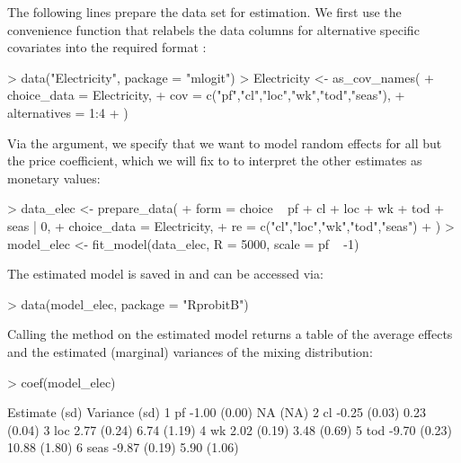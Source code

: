\documentclass[article]{jss}
\newcommand{\fct}[1]{\code{#1()}}
\begin{document}
The following lines prepare the  data set for estimation. We first use the convenience function \fct{as\_cov\_names} that relabels the data columns for alternative specific covariates into the required format :

\begin{Schunk}
\begin{Sinput}
> data("Electricity", package = "mlogit")
> Electricity <- as_cov_names(
+    choice_data = Electricity,
+    cov = c("pf","cl","loc","wk","tod","seas"),
+    alternatives = 1:4
+  )
\end{Sinput}
\end{Schunk}

Via the  argument, we specify that we want to model random effects for all but the price coefficient, which we will fix to  to interpret the other estimates as monetary values:

\begin{Schunk}
\begin{Sinput}
> data_elec <- prepare_data(
+    form = choice ~ pf + cl + loc + wk + tod + seas | 0,
+    choice_data = Electricity,
+    re = c("cl","loc","wk","tod","seas")
+  )
> model_elec <- fit_model(data_elec, R = 5000, scale = pf ~ -1)
\end{Sinput}
\end{Schunk}

The estimated model is saved in  and can be accessed via:

\begin{Schunk}
\begin{Sinput}
> data(model_elec, package = "RprobitB")
\end{Sinput}
\end{Schunk}

Calling the \fct{coef} method on the estimated model returns a table of the average effects and the estimated (marginal) variances of the mixing distribution:

\begin{Schunk}
\begin{Sinput}
> coef(model_elec)
\end{Sinput}
\begin{Soutput}
        Estimate   (sd) Variance   (sd)
1   pf     -1.00 (0.00)       NA   (NA)
2   cl     -0.25 (0.03)     0.23 (0.04)
3  loc      2.77 (0.24)     6.74 (1.19)
4   wk      2.02 (0.19)     3.48 (0.69)
5  tod     -9.70 (0.23)    10.88 (1.80)
6 seas     -9.87 (0.19)     5.90 (1.06)
\end{Soutput}
\end{Schunk}
\end{document}
